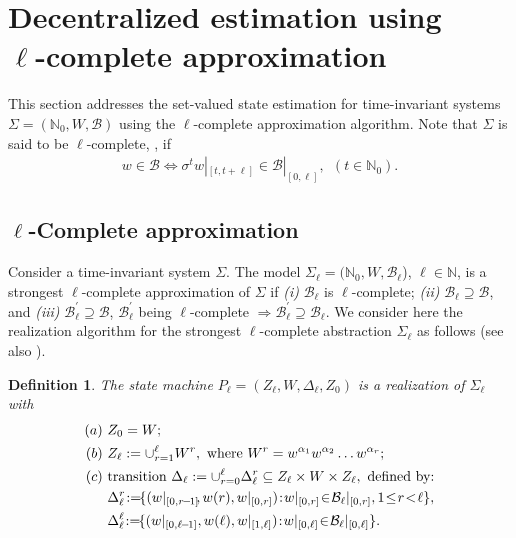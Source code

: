 \documentclass[a4paper, 10pt, conference]{ieeeconf}
\newtheorem{definition}{Definition}
\newcommand{\hspm}{\hspace{-2pt}}
\newcommand{\hspu}{\hspace{-1pt}}
\begin{document}
\section{Decentralized estimation using \\$\ell$-complete approximation}
\label{sec:Application}
This section addresses the set-valued state estimation for time-invariant systems $\Sigma=(\mathbb{N}_0,W,\mathcal{B})$ using the $\ell$-complete approximation algorithm. Note that $\Sigma$ is said to be $\ell$-complete, \cite{MoRaOY02}, if
\vspace{-4pt}
\begin{align}\label{eq:lcomp}
w\in \mathcal{B} \Leftrightarrow \sigma^t w|_{[t,t+\ell]}\in \mathcal{B}|_{[0,\ell]},~~(t\in \mathbb{N}_0).
\end{align}


\subsection{$\ell$-Complete approximation}
\label{sec:lComplete approximation}
Consider a time-invariant system $\Sigma$. The model $\Sigma_\ell=(\mathbb{N}_0,W,\mathcal{B}_\ell$), $\ell\in \mathbb{N}$, is a strongest $\ell$-complete approximation of $\Sigma$ if \emph{(i)} $\mathcal{B}_\ell$ is $\ell$-complete; \emph{(ii)} $\mathcal{B}_\ell\supseteq \mathcal{B}$, and \emph{(iii)} $\mathcal{B}_\ell^\prime \supseteq \mathcal{B}$, $\mathcal{B}_\ell^\prime$ being $\ell$-complete $\Rightarrow \mathcal{B}_\ell^\prime \supseteq \mathcal{B}_\ell$.
We consider here the realization algorithm for the strongest $\ell$-complete abstraction $\Sigma_\ell$ as follows (see also \cite{wodes2010}).
\begin{definition} \label{def:lcomplete} The state machine $P_\ell=(Z_\ell,W,\Delta_\ell,Z_0)$ is a realization of $\Sigma_\ell$ with
\vspace{-5pt}
\begin{align*}
\text(a)~ & Z_0= W; \nonumber\\
\text(b)~ & Z_\ell:=\cup_{r=1}^\ell W^r,~\text{where}~ W^r=w^{\alpha_1}w^{\alpha_2}\dots w^{\alpha_r}; \nonumber\\
\text(c)~ & \text{transition}~\Delta_\ell:=\cup_{r=0}^\ell\Delta_\ell^r\subseteq Z_\ell\times W\times Z_\ell,~\text{defined by:}\nonumber \\
{} & \Delta_\ell^r\hspm :=\hspm\hspm  \{(w|_{[0,r\hspu-\hspu 1]}\hspm, w(r), w|_{[0,r]})\hspm: \hspm w|_{[0,r]}\hspm \in\hspm \mathcal{B}_\ell|_{[0,r]}, 1\hspm \leq\hspm  r\hspm  <\hspm \ell\},\\
{} & \Delta_\ell^\ell\hspm:=\hspm \hspm \{(w|_{[0,\ell\hspu-\hspu 1]},w(\ell), w|_{[1,\ell]})\hspm:  \hspm w|_{[0,\ell]}\hspm \in\hspm \mathcal{B}_\ell|_{[0,\ell]}\}.
\end{align*}
\end{definition}
\end{document}
